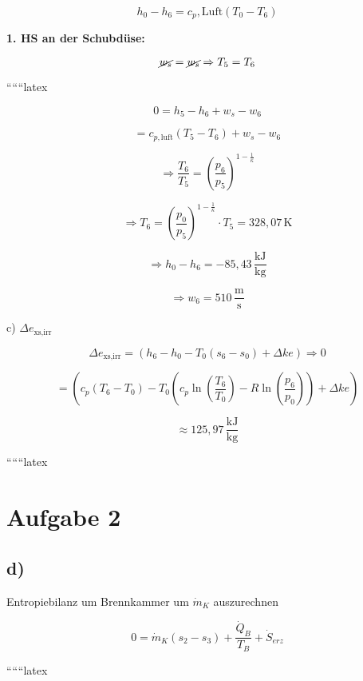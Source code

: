 \[
h_0 - h_6 = c_p, \text{Luft} \left( T_0 - T_6 \right)
\]

\textbf{1. HS an der Schubdüse:}

\[
\cancel{w_s} = \cancel{w_s} \Rightarrow T_5 = T_6
\]

``````latex

\[
0 = h_5 - h_6 + w_s - w_6
\]

\[
= c_{p, \text{luft}} (T_5 - T_6) + w_s - w_6
\]


\[
\Rightarrow \frac{T_6}{T_5} = \left( \frac{p_6}{p_5} \right)^{1 - \frac{1}{\kappa}}
\]

\[
\Rightarrow T_6 = \left( \frac{p_0}{p_5} \right)^{1 - \frac{1}{\kappa}} \cdot T_5 = 328{,}07 \, \text{K}
\]

\[
\Rightarrow h_0 - h_6 = -85{,}43 \, \frac{\text{kJ}}{\text{kg}}
\]

\[
\Rightarrow w_6 = 510 \, \frac{\text{m}}{\text{s}}
\]

c) \(\Delta e_{\text{xs,irr}}\)

\[
\Delta e_{\text{xs,irr}} = (h_6 - h_0 - T_0 (s_6 - s_0) + \Delta ke) \Rightarrow 0
\]

\[
= \left( c_p (T_6 - T_0) - T_0 \left( c_p \ln \left( \frac{T_6}{T_0} \right) - R \ln \left( \frac{p_6}{p_0} \right) \right) + \Delta ke \right)
\]

\[
\approx 125{,}97 \, \frac{\text{kJ}}{\text{kg}}
\]

``````latex


\section*{Aufgabe 2}

\subsection*{d)}
Entropiebilanz um Brennkammer um $\dot{m}_K$ auszurechnen

\[
0 = \dot{m}_K (s_2 - s_3) + \frac{\dot{Q}_B}{T_B} + \dot{S}_{erz}
\]

``````latex


